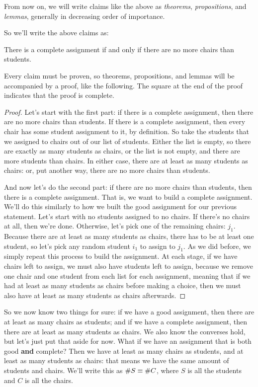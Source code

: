\documentclass[10pt]{article}
\begin{document}
From now on, we will write claims like the above as \emph{theorems}, \emph{propositions}, and \emph{lemmas}, generally in decreasing order of importance.

So we'll write the above claims as:
\begin{theorem}
    There is a complete assignment if and only if there are no more chairs than students.
\end{theorem}

Every claim must be proven, so theorems, propositions, and lemmas will be accompanied by a proof, like the following.
The square at the end of the proof indicates that the proof is complete.

\begin{proof}
    Let's start with the first part: if there is a complete assignment, then there are no more chairs than students.
    If there is a complete assignment, then every chair has some student assignment to it, by definition.
    So take the students that we assigned to chairs out of our list of students.
    Either the list is empty, so there are exactly as many students as chairs, or the list is not empty, and there are more students than chairs.
    In either case, there are at least as many students as chairs: or, put another way, there are no more chairs than students.

    And now let's do the second part: if there are no more chairs than students, then there is a complete assignment.
    That is, we want to build a complete assignment.
    We'll do this similarly to how we built the good assignment for our previous statement.
    Let's start with no students assigned to no chairs.
    If there's no chairs at all, then we're done.
    Otherwise, let's pick one of the remaining chairs: $j_1$.
    Because there are at least as many students as chairs, there has to be at least one student, so let's pick any random student $i_1$ to assign to $j_1$.
    As we did before, we simply repeat this process to build the assignment.
    At each stage, if we have chairs left to assign, we must also have students left to assign, because we remove one chair and one student from each list for each assignment, meaning that if we had at least as many students as chairs before making a choice, then we must also have at least as many students as chairs afterwards.
\end{proof}

So we now know two things for sure: if we have a good assignment, then there are at least as many chairs as students; and if we have a complete assignment, then there are at least as many students as chairs.
We also know the converses  hold, but let's just put that aside for now.
What if we have an assignment that is both good \textbf{and} complete?
Then we have at least as many chairs as students, and at least as many students as chairs: that means we have the same amount of students and chairs.
We'll write this as $\# S \equiv \# C$, where $S$ is all the students and $C$ is all the chairs.
\end{document}
